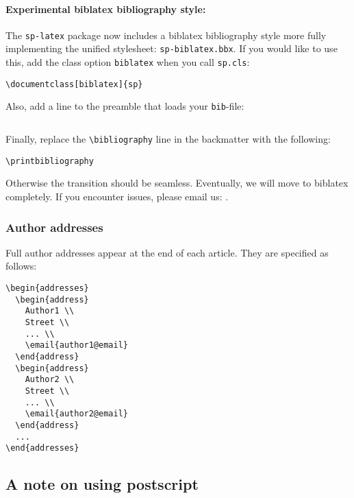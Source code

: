 \documentclass[lucida,final]{sp}
\newcommand{\spfile}[1]{\texttt{#1}}
\newcommand{\cmd}[1]{\texttt{\textbackslash#1}}
\begin{document}
\paragraph{Experimental biblatex bibliography style:}
%
The \texttt{sp-latex} package now includes a biblatex bibliography style 
more fully implementing the unified stylesheet: 
\texttt{sp-biblatex.bbx}. If you would like to use this, add the class 
option \texttt{biblatex} when you call \texttt{sp.cls}:
%
\begin{Verbatim}
\documentclass[biblatex]{sp}
\end{Verbatim}
%
Also, add a line to the preamble that loads your \spfile{bib}-file: 
%
\begin{Verbatim}

\end{Verbatim}
%
Finally, replace the \cmd{bibliography} line in the backmatter with the 
following:
%
\begin{Verbatim}
\printbibliography
\end{Verbatim}
%
Otherwise the transition should be seamless. Eventually, we will move to 
biblatex completely. If you encounter issues, please email us: 
.

\subsubsection{Author addresses}

Full author addresses appear at the end of each article.  They are
specified as follows:
%
\begin{Verbatim}
\begin{addresses}
  \begin{address}
    Author1 \\
    Street \\
    ... \\
    \email{author1@email}
  \end{address}
  \begin{address}
    Author2 \\
    Street \\
    ... \\
    \email{author2@email}
  \end{address}
  ...
\end{addresses}
\end{Verbatim}



\subsection{A note on using postscript}\label{sec:ps}
\end{document}
